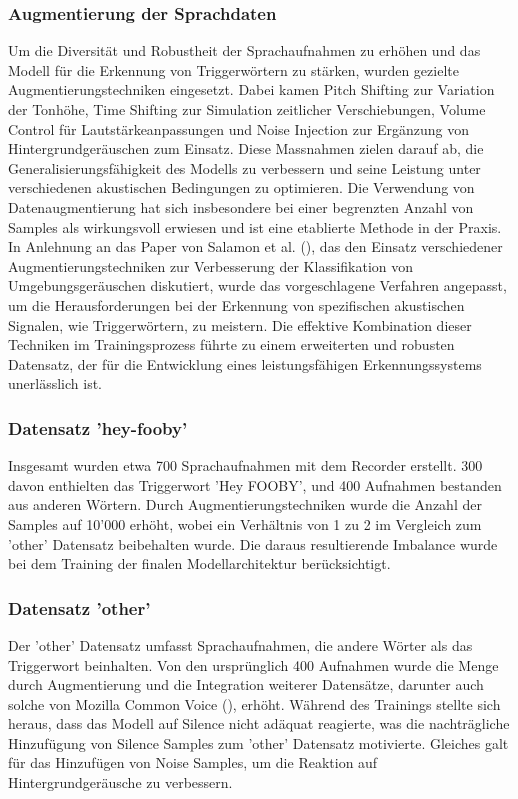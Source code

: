 \documentclass[11pt,a4paper]{article}
\begin{document}
\subsubsection{Augmentierung der Sprachdaten} \label{sec:augmentierung}
Um die Diversität und Robustheit der Sprachaufnahmen zu erhöhen und das Modell für die Erkennung 
von Triggerwörtern zu stärken, wurden gezielte Augmentierungstechniken eingesetzt. Dabei kamen 
Pitch Shifting zur Variation der Tonhöhe, Time Shifting zur Simulation zeitlicher Verschiebungen, 
Volume Control für Lautstärkeanpassungen und Noise Injection zur Ergänzung von 
Hintergrundgeräuschen zum Einsatz. Diese Massnahmen zielen darauf ab, die Generalisierungsfähigkeit 
des Modells zu verbessern und seine Leistung unter verschiedenen akustischen Bedingungen zu 
optimieren. Die Verwendung von Datenaugmentierung hat sich insbesondere bei einer begrenzten 
Anzahl von Samples als wirkungsvoll erwiesen und ist eine etablierte Methode in der Praxis. In 
Anlehnung an das Paper von Salamon et al. (\cite{salamon2017deep}), das den Einsatz verschiedener 
Augmentierungstechniken zur Verbesserung der Klassifikation von Umgebungsgeräuschen diskutiert, 
wurde das vorgeschlagene Verfahren angepasst, um die Herausforderungen bei der Erkennung von 
spezifischen akustischen Signalen, wie Triggerwörtern, zu meistern. Die effektive Kombination 
dieser Techniken im Trainingsprozess führte zu einem erweiterten und robusten Datensatz, der für 
die Entwicklung eines leistungsfähigen Erkennungssystems unerlässlich ist.


\subsubsection{Datensatz 'hey-fooby'}
Insgesamt wurden etwa 700 Sprachaufnahmen mit dem Recorder erstellt. 300 davon enthielten das 
Triggerwort 'Hey FOOBY', und 400 Aufnahmen bestanden aus anderen Wörtern. Durch 
Augmentierungstechniken wurde die Anzahl der Samples auf 10'000 erhöht, wobei ein Verhältnis von 
1 zu 2 im Vergleich zum 'other' Datensatz beibehalten wurde. Die daraus resultierende 
Imbalance wurde bei dem Training der finalen Modellarchitektur berücksichtigt.

\subsubsection{Datensatz 'other'}
Der 'other' Datensatz umfasst Sprachaufnahmen, die andere Wörter als das Triggerwort beinhalten. 
Von den ursprünglich 400 Aufnahmen wurde die Menge durch Augmentierung und die Integration 
weiterer Datensätze, darunter auch solche von Mozilla Common Voice (\cite{ardila2020common}), 
erhöht. Während des Trainings stellte sich heraus, dass das Modell auf Silence nicht adäquat 
reagierte, was die nachträgliche Hinzufügung von Silence Samples zum 'other' Datensatz motivierte. 
Gleiches galt für das Hinzufügen von Noise Samples, um die Reaktion auf Hintergrundgeräusche zu 
verbessern.
\end{document}
